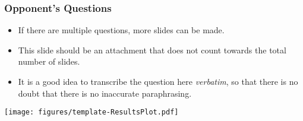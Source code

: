   
  \appendix{}
  \begin{frame}
    \frametitle{Opponent's Questions}
    \begin{itemize}
      \item If there are multiple questions, more slides can be made.
      \item This slide should be an attachment that does not count towards the total number of slides.
      \item It is a good idea to transcribe the question here \emph{verbatim}, so that there is no doubt that there is no inaccurate paraphrasing.
    \end{itemize}
    \bigskip
    \texttt{[image: figures/template-ResultsPlot.pdf]}
  \end{frame}